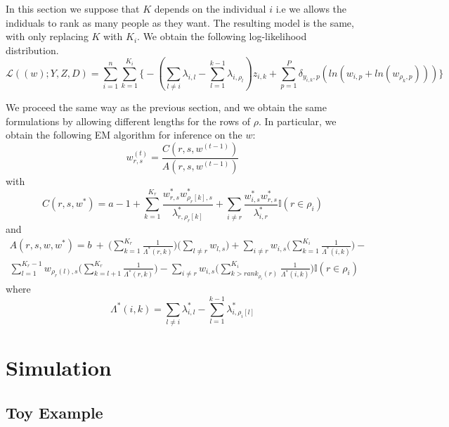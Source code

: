 \documentclass[12pt]{ociamthesis}  %
\begin{document}
	In this section we suppose that $K$ depends on the individual $i$ i.e we allows the indiduals to rank as many people as they want. The resulting model is the same, with only replacing $K$ with $K_{i}$.
	We obtain the following log-likelihood distribution.
	\begin{equation}
	\mathcal{L}((w);Y,Z,D) = \sum_{i = 1}^{n} \sum_{k = 1}^{K_{i}} \bigg\{ -(\sum_{l \neq i} \lambda_{i,l} - \sum_{l = 1}^{k - 1} \lambda_{i,\rho_{l}})z_{i,k} + \sum_{p = 1}^{P} \delta_{y_{i,k}, p} (ln(w_{i,p} + ln(w_{\rho_{k},p}))) \bigg\}
	\end{equation}
	
	We proceed the same way as the previous section, and we obtain the same formulations by allowing different lengths for the rows of $\rho$. In particular, we obtain the following EM algorithm for inference on the $w$:
	\begin{equation}
	w^{(t)}_{r,s} = \frac{C(r,s,w^{(t-1)})}{A(r,s,w^{(t-1)})}
	\end{equation} with
	\begin{equation}
	C(r,s,w^{*}) = a - 1 + \sum_{k = 1}^{K_{r}}\frac{w^{*}_{r,s}w^{*}_{\rho_{r}[k],s}}{\lambda^{*}_{r,\rho_{r}[k]}} + \sum_{i \neq r} \frac{w^{*}_{i,s}w^{*}_{r,s}}{\lambda^{*}_{i,r}} \mathbb{I}(r \in \rho_{i})
	\end{equation} and
	\begin{multline}
	A(r,s,w,w^{*}) = b \ + \ \bigg( \sum_{k = 1}^{K_{r}} \frac{1}{\Lambda^{*}(r,k)} \bigg) \bigg( \sum_{l \neq r} w_{l,s} \bigg) + \sum_{i \neq r} w_{i,s} \bigg( \sum_{k = 1}^{K_{i}} \frac{1}{\Lambda^{*}(i,k)} \bigg) - \\ \sum_{l = 1}^{K_{r}-1} w_{\rho_{r}(l), s} \bigg( \sum_{k = l+1}^{K_{r}} \frac{1}{\Lambda^{*}(r,k)} \bigg) - \sum_{i \neq r} w_{i,s} \bigg( \sum_{k > rank_{\rho_{i}}(r)}^{K_{i}} \frac{1}{\Lambda^{*}(i,k)} \bigg)\mathbb{I}(r \in \rho_{i})
	\end{multline} where
	\begin{equation}
	\Lambda^{*}(i,k) = \sum_{l \neq i} \lambda^{*}_{i,l} - \sum_{l = 1}^{k-1} \lambda^{*}_{i,\rho_{i}[l]}
	\end{equation}
	
	\newpage
	\section{Simulation}
	
	\subsection{Toy Example}
	
\end{document}
